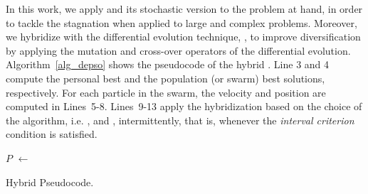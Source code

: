 In this work, we apply \hcpso{} and its stochastic version \shpso{} to the problem at hand, in order to tackle the \pso{} stagnation when applied to large and complex problems. Moreover, we hybridize \pso{} with the differential evolution technique, \depso{}, to improve diversification by applying the mutation and cross-over operators of the differential evolution. Algorithm~\ref{alg_depso} shows the pseudocode of the hybrid \pso{}. Line 3 and 4 compute the personal best and the population (or swarm) best solutions, respectively. For each particle in the swarm, the velocity and position are computed in Lines~5-8. Lines~9-13 apply the hybridization based on the choice of the algorithm, i.e. \de, \hcpso{} and \shpso{}, intermittently, that is, whenever the \textit{interval criterion} condition is satisfied.
\IncMargin{1em}
\begin{algorithm}[H]
	\SetAlgoLined
	
	\BlankLine
	\BlankLine
	\Particles $P$ $\leftarrow$ \InitPSO{}\;
	\BlankLine
	\caption{Hybrid \pso{} Pseudocode.}
	\label{alg_depso}
\end{algorithm}\DecMargin{1em}

